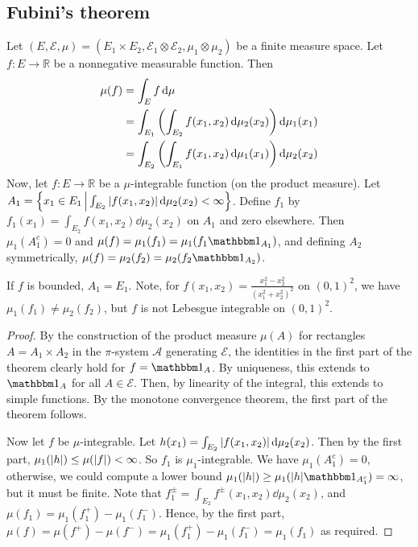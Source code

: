 \subsection{Fubini's theorem}
\begin{theorem}
	Let \( (E, \mathcal E, \mu) = (E_1 \times E_2, \mathcal E_1 \otimes \mathcal E_2, \mu_1 \otimes \mu_2) \) be a finite measure space.
	Let \( f \colon E \to \mathbb R \) be a nonnegative measurable function.
	Then
	\begin{align*}
		\mu(f) &= \int_E f \dd{\mu} \\
		&= \int_{E_1} \qty( \int_{E_2} f(x_1,x_2) \dd{\mu_2(x_2)} ) \dd{\mu_1(x_1)} \\
		&= \int_{E_2} \qty( \int_{E_1} f(x_1,x_2) \dd{\mu_1(x_1)} ) \dd{\mu_2(x_2)}
	\end{align*}
	Now, let \( f \colon E \to \mathbb R \) be a \( \mu \)-integrable function (on the product measure).
	Let \( A_1 = \qty{x_1 \in E_1 \,\middle|\,\int_{E_2} \abs{f(x_1,x_2)} \dd{\mu_2(x_2)} < \infty} \).
	Define \( f_1 \) by \( f_1(x_1) = \int_{E_2} f(x_1,x_2) \dd{\mu_2(x_2)} \) on \( A_1 \) and zero elsewhere.
	Then \( \mu_1(A_1^c) = 0 \) and \( \mu(f) = \mu_1(f_1) = \mu_1(f_1 \mathbbm 1_{A_1}) \), and defining \( A_2 \) symmetrically, \( \mu(f) = \mu_2(f_2) = \mu_2(f_2 \mathbbm 1_{A_2}) \).
\end{theorem}
\begin{remark}
	If \( f \) is bounded, \( A_1 = E_1 \).
	Note, for \( f(x_1,x_2) = \frac{x_1^2-x_2^2}{(x_1^2+x_2^2)^2} \) on \( (0,1)^2 \), we have \( \mu_1(f_1) \neq \mu_2(f_2) \), but \( f \) is not Lebesgue integrable on \( (0,1)^2 \).
\end{remark}
\begin{proof}
	By the construction of the product measure \( \mu(A) \) for rectangles \( A = A_1 \times A_2 \) in the \( \pi \)-system \( \mathcal A \) generating \( \mathcal E \), the identities in the first part of the theorem clearly hold for \( f = \mathbbm 1_A \).
	By uniqueness, this extends to \( \mathbbm 1_A \) for all \( A \in \mathcal E \).
	Then, by linearity of the integral, this extends to simple functions.
	By the monotone convergence theorem, the first part of the theorem follows.

	Now let \( f \) be \( \mu \)-integrable.
	Let \( h(x_1) = \int_{E_2} \abs{f(x_1,x_2)} \dd{\mu_2(x_2)} \).
	Then by the first part, \( \mu_1(\abs{h}) \leq \mu(\abs{f}) < \infty \).
	So \( f_1 \) is \( \mu_1 \)-integrable.
	We have \( \mu_1(A_1^c) = 0 \), otherwise, we could compute a lower bound \( \mu_1(\abs{h}) \geq \mu_1(\abs{h} \mathbbm 1_{A_1^c}) = \infty \), but it must be finite.
	Note that \( f_1^\pm = \int_{E_2} f^\pm(x_1,x_2) \dd{\mu_2(x_2)} \), and \( \mu(f_1) = \mu_1(f_1^+) - \mu_1(f_1^-) \).
	Hence, by the first part, \( \mu(f) = \mu(f^+) - \mu(f^-) = \mu_1(f_1^+) - \mu_1(f_1^-) = \mu_1(f_1) \) as required.
\end{proof}
